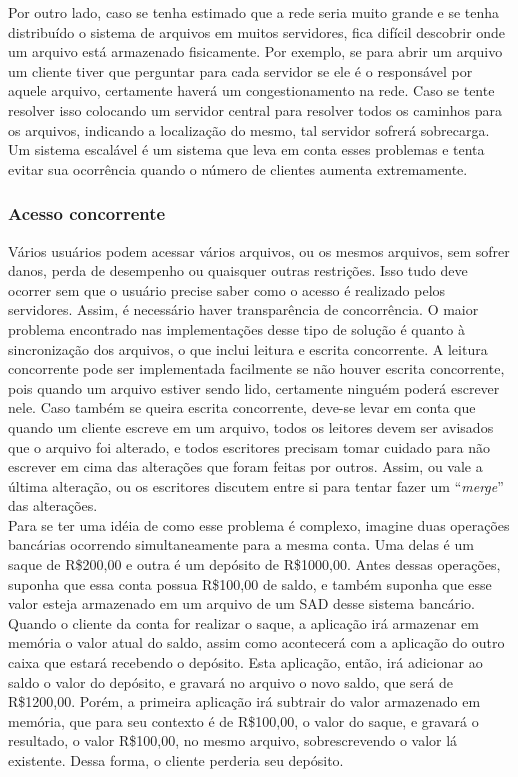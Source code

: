 	Por outro lado, caso se tenha estimado que a rede seria muito grande e se tenha distribuído o sistema de arquivos em muitos servidores, fica difícil descobrir onde um arquivo está armazenado fisicamente. Por exemplo, se para abrir um arquivo um cliente tiver que perguntar para cada servidor se ele é o responsável por aquele arquivo, certamente haverá um congestionamento na rede. Caso se tente resolver isso colocando um servidor central para resolver todos os caminhos para os arquivos, indicando a localização do mesmo, tal servidor sofrerá sobrecarga. Um sistema escalável é um sistema que leva em conta esses problemas e tenta evitar sua ocorrência quando o número de clientes aumenta extremamente.
	
	\subsubsection{Acesso concorrente}
	Vários usuários podem acessar vários arquivos, ou os mesmos arquivos, sem sofrer danos, perda de desempenho ou quaisquer outras restrições. Isso tudo deve ocorrer sem que o usuário precise saber como o acesso é realizado pelos servidores. Assim, é necessário haver transparência de concorrência.
	O maior problema encontrado nas implementações desse tipo de solução é quanto à sincronização dos arquivos, o que inclui leitura e escrita concorrente. A leitura concorrente pode ser implementada facilmente se não houver escrita concorrente, pois quando um arquivo estiver sendo lido, certamente ninguém poderá escrever nele. Caso também se queira escrita concorrente, deve-se levar em conta que quando um cliente escreve em um arquivo, todos os leitores devem ser avisados que o arquivo foi alterado, e todos escritores precisam tomar cuidado para não escrever em cima das alterações que foram feitas por outros. Assim, ou vale a última alteração, ou os escritores discutem entre si para tentar fazer um “\textit{merge}” das alterações. \\
	
	Para se ter uma idéia de como esse problema é complexo, imagine duas operações bancárias ocorrendo simultaneamente para a mesma conta. Uma delas é um saque de R\$200,00 e outra é um depósito de R\$1000,00. Antes dessas operações, suponha que essa conta possua R\$100,00 de saldo, e também suponha que esse valor esteja armazenado em um arquivo de um SAD desse sistema bancário. Quando o cliente da conta for realizar o saque, a aplicação irá armazenar em memória o valor atual do saldo, assim como acontecerá com a aplicação do outro caixa que estará recebendo o depósito. Esta aplicação, então, irá adicionar ao saldo o valor do depósito, e gravará no arquivo o novo saldo, que será de R\$1200,00. Porém, a primeira aplicação irá subtrair do valor armazenado em memória, que para seu contexto é de R\$100,00, o valor do saque, e gravará o resultado, o valor R\$100,00, no mesmo arquivo, sobrescrevendo o valor lá existente. Dessa forma, o cliente perderia seu depósito.\\
	
